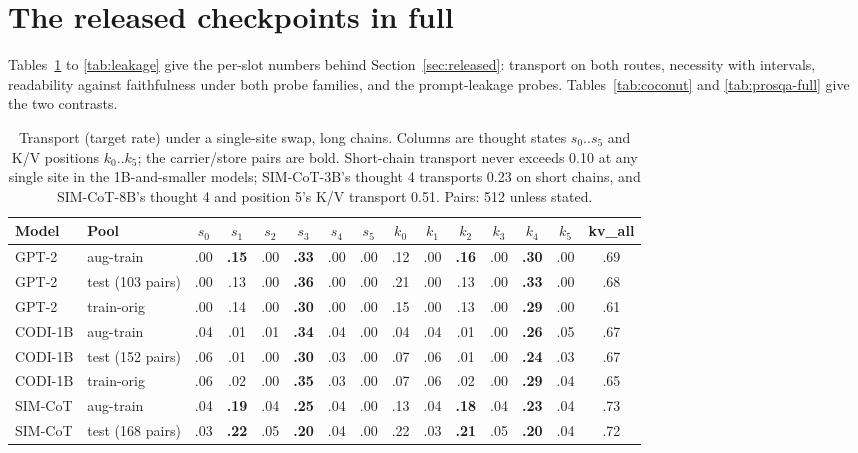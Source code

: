 \section{The released checkpoints in full}\label{app:released}

Tables~\ref{tab:transport} to \ref{tab:leakage} give the per-slot numbers behind Section~\ref{sec:released}: transport on both routes, necessity with intervals, readability against faithfulness under both probe families, and the prompt-leakage probes. Tables~\ref{tab:coconut} and \ref{tab:prosqa-full} give the two contrasts.

\begin{table}[htbp]
\caption{Transport (target rate) under a single-site swap, long chains. Columns are thought states $s_0..s_5$ and K/V positions $k_0..k_5$; the carrier/store pairs are bold. Short-chain transport never exceeds 0.10 at any single site in the 1B-and-smaller models; SIM-CoT-3B's thought 4 transports 0.23 on short chains, and SIM-CoT-8B's thought 4 and position 5's K/V transport 0.51. Pairs: 512 unless stated.}
\label{tab:transport}
\centering
\scriptsize
\setlength{\tabcolsep}{3pt}
\begin{tabular}{llcccccc|cccccc|c}
\toprule
Model & Pool & $s_0$ & $s_1$ & $s_2$ & $s_3$ & $s_4$ & $s_5$ & $k_0$ & $k_1$ & $k_2$ & $k_3$ & $k_4$ & $k_5$ & kv\_all \\
\midrule
GPT-2 & aug-train & .00 & \textbf{.15} & .00 & \textbf{.33} & .00 & .00 & .12 & .00 & \textbf{.16} & .00 & \textbf{.30} & .00 & .69 \\
GPT-2 & test (103 pairs) & .00 & .13 & .00 & \textbf{.36} & .00 & .00 & .21 & .00 & .13 & .00 & \textbf{.33} & .00 & .68 \\
GPT-2 & train-orig & .00 & .14 & .00 & \textbf{.30} & .00 & .00 & .15 & .00 & .13 & .00 & \textbf{.29} & .00 & .61 \\
CODI-1B & aug-train & .04 & .01 & .01 & \textbf{.34} & .04 & .00 & .04 & .04 & .01 & .00 & \textbf{.26} & .05 & .67 \\
CODI-1B & test (152 pairs) & .06 & .01 & .00 & \textbf{.30} & .03 & .00 & .07 & .06 & .01 & .00 & \textbf{.24} & .03 & .67 \\
CODI-1B & train-orig & .06 & .02 & .00 & \textbf{.35} & .03 & .00 & .07 & .06 & .02 & .00 & \textbf{.29} & .04 & .65 \\
SIM-CoT & aug-train & .04 & \textbf{.19} & .04 & \textbf{.25} & .04 & .00 & .13 & .04 & \textbf{.18} & .04 & \textbf{.23} & .04 & .73 \\
SIM-CoT & test (168 pairs) & .03 & \textbf{.22} & .05 & \textbf{.20} & .04 & .00 & .22 & .03 & \textbf{.21} & .05 & \textbf{.20} & .04 & .72 \\

\end{tabular}
\end{table}
